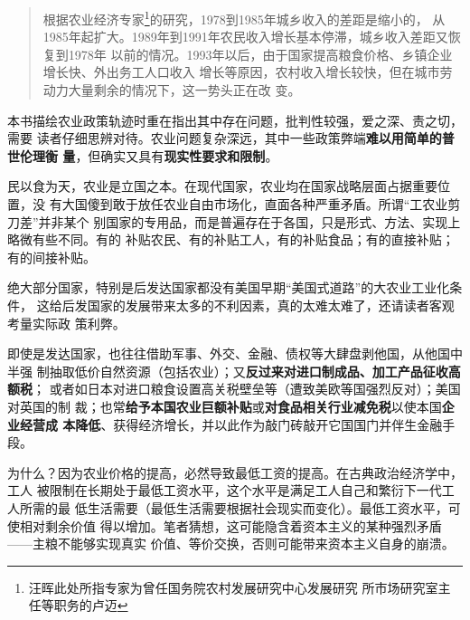 
\begin{quotation}
  根据农业经济专家\footnote{汪晖此处所指专家为曾任国务院农村发展研究中心发展研究
    所市场研究室主任等职务的卢迈}的研究，1978到1985年城乡收入的差距是缩小的，
  从1985年起扩大。1989年到1991年农民收入增长基本停滞，城乡收入差距又恢复到1978年
  以前的情况。1993年以后，由于国家提高粮食价格、乡镇企业增长快、外出务工人口收入
  增长等原因，农村收入增长较快，但在城市劳动力大量剩余的情况下，这一势头正在改
  变。\cite{wangxiandai}

\end{quotation}


本书描绘农业政策轨迹时重在指出其中存在问题，批判性较强，爱之深、责之切，需要
读者仔细思辨对待。农业问题复杂深远，其中一些政策弊端\textbf{难以用简单的普世伦理衡
  量}，但确实又具有\textbf{现实性要求和限制}。

民以食为天，农业是立国之本。在现代国家，农业均在国家战略层面占据重要位置，没
有大国傻到敢于放任农业自由市场化，直面各种严重矛盾。所谓“工农业剪刀差”并非某个
别国家的专用品，而是普遍存在于各国，只是形式、方法、实现上略微有些不同。有的
补贴农民、有的补贴工人，有的补贴食品；有的直接补贴；有的间接补贴。

绝大部分国家，特别是后发达国家都没有美国早期“美国式道路”的大农业工业化条件，
这给后发国家的发展带来太多的不利因素，真的太难太难了，还请读者客观考量实际政
策利弊。

即使是发达国家，也往往借助军事、外交、金融、债权等大肆盘剥他国，从他国中半强
制抽取低价自然资源（包括农业）；又\textbf{反过来对进口制成品、加工产品征收高额税}；
或者如日本对进口粮食设置高关税壁垒等（遭致美欧等国强烈反对）；美国对英国的制
裁；也常\textbf{给予本国农业巨额补贴}或\textbf{对食品相关行业减免税}以使本国\textbf{企业经营成
  本降低}、获得经济增长，并以此作为敲门砖敲开它国国门并伴生金融手段。

为什么？因为农业价格的提高，必然导致最低工资的提高。在古典政治经济学中，工人
被限制在长期处于最低工资水平，这个水平是满足工人自己和繁衍下一代工人所需的最
低生活需要（最低生活需要根据社会现实而变化）。最低工资水平，可使相对剩余价值
得以增加。笔者猜想，这可能隐含着资本主义的某种强烈矛盾——主粮不能够实现真实
价值、等价交换，否则可能带来资本主义自身的崩溃。


